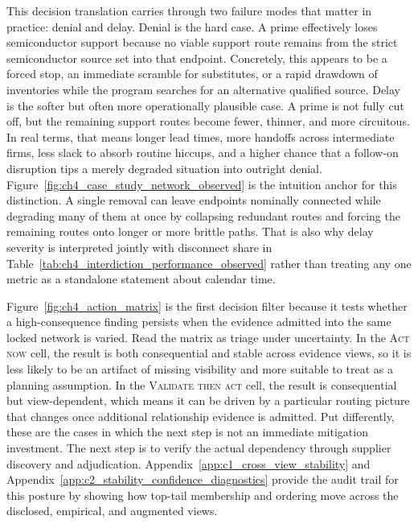 This decision translation carries through two failure modes that matter in practice: denial and delay. Denial is the hard case. A prime effectively loses semiconductor support because no viable support route remains from the strict semiconductor source set into that endpoint. Concretely, this appears to be a forced stop, an immediate scramble for substitutes, or a rapid drawdown of inventories while the program searches for an alternative qualified source. Delay is the softer but often more operationally plausible case. A prime is not fully cut off, but the remaining support routes become fewer, thinner, and more circuitous. In real terms, that means longer lead times, more handoffs across intermediate firms, less slack to absorb routine hiccups, and a higher chance that a follow-on disruption tips a merely degraded situation into outright denial. Figure~\ref{fig:ch4_case_study_network_observed} is the intuition anchor for this distinction. A single removal can leave endpoints nominally connected while degrading many of them at once by collapsing redundant routes and forcing the remaining routes onto longer or more brittle paths. That is also why delay severity is interpreted jointly with disconnect share in Table~\ref{tab:ch4_interdiction_performance_observed} rather than treating any one metric as a standalone statement about calendar time.

Figure~\ref{fig:ch4_action_matrix} is the first decision filter because it tests whether a high-consequence finding persists when the evidence admitted into the same locked network is varied. Read the matrix as triage under uncertainty. In the \textsc{Act now} cell, the result is both consequential and stable across evidence views, so it is less likely to be an artifact of missing visibility and more suitable to treat as a planning assumption. In the \textsc{Validate then act} cell, the result is consequential but view-dependent, which means it can be driven by a particular routing picture that changes once additional relationship evidence is admitted. Put differently, these are the cases in which the next step is not an immediate mitigation investment. The next step is to verify the actual dependency through supplier discovery and adjudication. Appendix~\ref{app:c1_cross_view_stability} and Appendix~\ref{app:c2_stability_confidence_diagnostics} provide the audit trail for this posture by showing how top-tail membership and ordering move across the disclosed, empirical, and augmented views.

